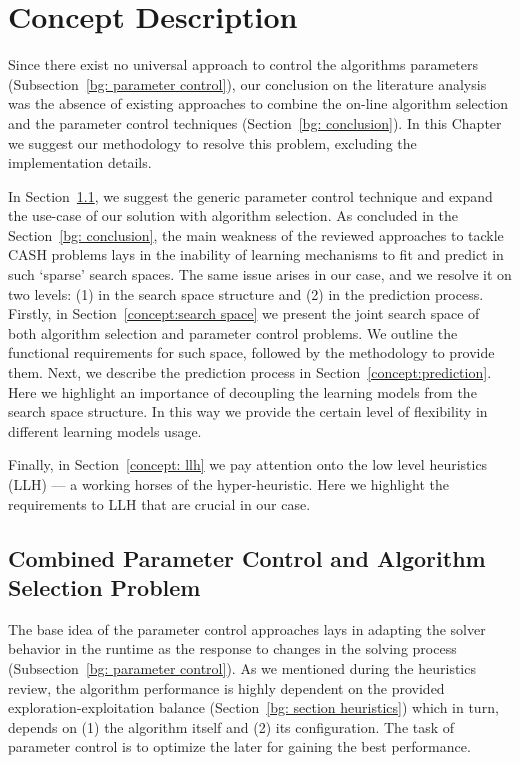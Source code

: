 \chapter{Concept Description}
Since there exist no universal approach to control the algorithms parameters (Subsection~\ref{bg: parameter control}), our conclusion on the literature analysis was the absence of existing approaches to combine the on-line algorithm selection and the parameter control techniques (Section~\ref{bg: conclusion}). In this Chapter we suggest our methodology to resolve this problem, excluding the implementation details.

In Section~\ref{concept:parameter control}, we suggest the generic parameter control technique and expand the use-case of our solution with algorithm selection. As concluded in the Section~\ref{bg: conclusion}, the main weakness of the reviewed approaches to tackle CASH problems lays in the inability of learning mechanisms to fit and predict in such `sparse' search spaces. The same issue arises in our case, and we resolve it on two levels: (1) in the search space structure and (2) in the prediction process. Firstly, in Section~\ref{concept:search space} we present the joint search space of both algorithm selection and parameter control problems. We outline the functional requirements for such space, followed by the methodology to provide them. Next, we describe the prediction process in Section~\ref{concept:prediction}. Here we highlight an importance of decoupling the learning models from the search space structure. In this way we provide the certain level of flexibility in different learning models usage.

Finally, in Section~\ref{concept: llh} we pay attention onto the low level heuristics (LLH) — a working horses of the hyper-heuristic. Here we highlight the requirements to LLH that are crucial in our case.


\section{Combined Parameter Control and Algorithm Selection Problem}\label{concept:parameter control}
The base idea of the parameter control approaches lays in adapting the solver behavior in the runtime as the response to changes in the solving process (Subsection~\ref{bg: parameter control}). As we mentioned during the heuristics review, the algorithm performance is highly dependent on the provided exploration-exploitation balance (Section~\ref{bg: section heuristics}) which in turn, depends on (1) the algorithm itself and (2) its configuration. The task of parameter control is to optimize the later for gaining the best performance. 

